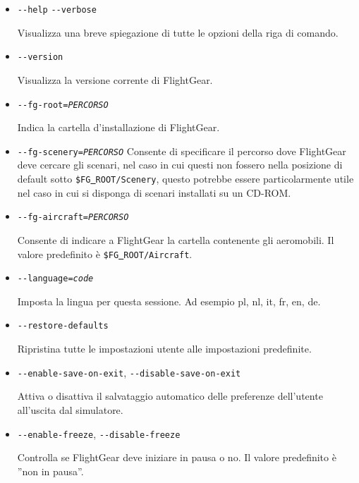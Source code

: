 \begin{itemize}
{\begin{itemize}
    Visualizza una breve spiegazione delle pi\`{u} importanti opzioni della riga di comando.

  \item{\texttt{-$ $-help} \texttt{-$ $-verbose}}

    Visualizza una breve spiegazione di tutte le opzioni della riga di comando.

  \item{\texttt{-$ $-version} }

    Visualizza la versione corrente di FlightGear.

  \item{\texttt{-$ $-fg-root={\it PERCORSO}}}

    Indica la cartella d'installazione di FlightGear.

  \item{\texttt{-$ $-fg-scenery={\it PERCORSO}}}
    Consente di specificare il percorso dove FlightGear deve cercare gli
    scenari, nel caso in cui questi non fossero nella posizione di default
    sotto \texttt{\$FG\underline{~}ROOT/Scenery}, questo potrebbe essere
    particolarmente utile nel caso in cui si disponga di scenari installati
    su un CD-ROM.

  \item{\texttt{-$ $-fg-aircraft={\it PERCORSO}}}

    Consente di indicare a FlightGear la cartella contenente gli aeromobili.
    Il valore predefinito \`{e}
    \texttt{\$FG\underline{~}ROOT/Aircraft}.

  \item{\texttt{-$ $-language={\it code}}}

    Imposta la lingua per questa sessione. Ad esempio pl, nl, it, fr, en, de.

  \item{\texttt{-$ $-restore-defaults}}

    Ripristina tutte le impostazioni utente alle impostazioni predefinite.

  \item{\texttt{-$ $-enable-save-on-exit}, \texttt{-$ $-disable-save-on-exit}}

    Attiva o disattiva il salvataggio automatico delle preferenze
    dell'utente all'uscita dal simulatore.

  \item{\texttt{-$ $-enable-freeze}, \texttt{-$ $-disable-freeze}}

    Controlla se FlightGear deve iniziare in pausa o no. Il valore
    predefinito \`{e} ''non in pausa''.


\end{itemize}}
\end{itemize}
